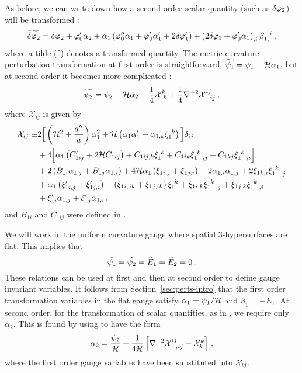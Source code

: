 As before, we
can write down how a second order scalar quantity (such as $\delta\varphi_{2}$) will be
transformed \cite{Malik:2005cy}:
% 
\begin{equation}
\label{eq:dvp2transform-perts}
 \widetilde{\delta\varphi_{2}} = \delta\varphi_{2} + \varphi_0'\alpha_2 + \alpha_1\left(\varphi_0'' \alpha_1 + \varphi_0'
\alpha_1' + 2\delta\varphi_{1}'\right) + \left(2\delta\varphi_{1} + \varphi_0'\alpha_1\right)_{,i}
\beta_{1,}^{~~i} \,,
\end{equation}
% 
where a tilde ($\widetilde{~}$) denotes a transformed quantity. 
The metric curvature perturbation transformation at first order is straightforward,
$\widetilde{\psi_1} = \psi_1 -\mathcal{H} \alpha_1$, but at second order it becomes more complicated
\cite{Malik:2008im}:
% 
\begin{equation}
 \label{eq:psi2transform-perts}
\widetilde{\psi_2} = \psi_2 -\mathcal{H}\alpha_2 -\frac{1}{4}\mathcal{X}^k_{~k} +
 \frac{1}{4}\nabla^{-2} \mathcal{X}^{ij}_{~~ij}\,,
\end{equation}
% 
where $\mathcal{X}_{ij}$ is given by
% 
\begin{align}
 \label{Xijdef}
\mathcal{X}_{ij} \equiv 
&2\Big[\left(\H^2+\frac{a''}{a}\right)\alpha_1^2
+\H\left(\alpha_1\alpha_1'+\alpha_{1,k}\xi_{1}^{~k}
\right)\Big] \delta_{ij}\nonumber\\
%
&
+4\Big[\alpha_1\left(C_{1ij}'+2\H C_{1ij}\right)
+C_{1ij,k}\xi_{1}^{~k}+C_{1ik}\xi_{1~~,j}^{~k}
+C_{1kj}\xi_{1~~,i}^{~k}\Big] \nonumber\\
% 
&+2\left(B_{1i}\alpha_{1,j}+B_{1j}\alpha_{1,i}\right)
+4\H\alpha_1\left( \xi_{1i,j}+\xi_{1j,i}\right)
-2\alpha_{1,i}\alpha_{1,j}+2\xi_{1k,i}\xi_{1~~,j}^{~k} \nonumber \\
% 
&+\alpha_1\left( \xi_{1i,j}'+\xi_{1j,i}' \right)
+\left(\xi_{1i,jk}+\xi_{1j,ik}\right)\xi_{1}^{~k}
+\xi_{1i,k}\xi_{1~~,j}^{~k}+\xi_{1j,k}\xi_{1~~,i}^{~k} \nonumber \\
% 
&+\xi_{1i}'\alpha_{1,j}+\xi_{1j}'\alpha_{1,i}
\,,
\end{align}
% 
and $B_{1i}$ and $C_{1ij}$ were defined in .

% 
We will work in the uniform curvature gauge where spatial 3-hypersurfaces are flat.
This implies that
%  
\begin{equation}
 \label{eq:gauge-num}
\widetilde\psi_1=\widetilde\psi_2=\widetilde E_1=\widetilde E_2=0 \,.
\end{equation}
% 
These relations can be used at first and then at second order to define gauge
invariant variables. It follows from Section~\ref{sec:perts-intro} that the first
order
transformation variables in the flat gauge satisfy $\alpha_1 = \psi_1/\mathcal{H}$ and
$\beta_1
= -E_1$. At second order, for the transformation of scalar quantities, as in
, we require only $\alpha_2$. This is found by using
 to have the form
% 
\begin{equation}
 \label{eq:alpha2-perts}
\alpha_2=\frac{\psi_2}{\mathcal{H}}+\frac{1}{4\mathcal{H}}\left[
\nabla^{-2}\mathcal{X}^{ij}_{~~,ij}-\mathcal{X}^k_{ k}\right]\,,
\end{equation}
% 
where the first order gauge variables have been substituted into $\mathcal{X}_{ij}$.

